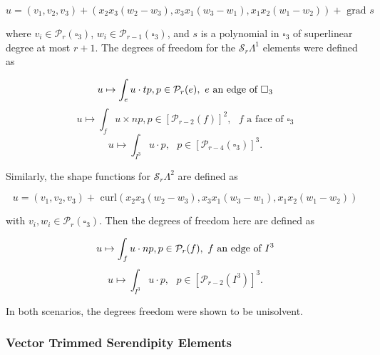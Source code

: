 \documentclass[manuscript,screen]{acmart}
\newcommand{\calP}{\mathcal{P}}
\newcommand{\calS}{\mathcal{S}}
\begin{document}
  \begin{equation}
      u = (v_1, v_2, v_3) +(x_2x_3(w_2 - w_3), x_3x_1(w_3 - w_1), x_1x_2(w_1 - w_2)) + \text{ grad } s
  \end{equation}
  
  \noindent where $v_i \in \calP_r(\square_3)$, $w_i \in \calP_{r-1}(\square_3)$, and $s$ is a polynomial in $\square_3$ of superlinear degree at most $r+1$. The degrees of freedom for the $\calS_r \Lambda^1$ elements were defined as 
  
  \begin{equation*}
      u \mapsto \int_e u \cdot tp, p \in \calP_r(e), \text{ } e \text{ an edge of } \square_3 \\
  \end{equation*}
  \begin{equation*}
      u \mapsto \int_f u \times np, p \in [\calP_{r-2}(f)]^2, \text{ } f \text{ a face of } \square_3
  \end{equation*}
  \begin{equation*}
      u \mapsto \int_{I^3} u \cdot p, \text{ } p \in [\calP_{r-4}(\square_3)]^3.
  \end{equation*}
  
  Similarly, the shape functions for $\calS_r \Lambda^2$ are defined as
  
  \begin{equation}
      u = (v_1, v_2, v_3) + \text{ curl}(x_2x_3(w_2 - w_3), x_3x_1(w_3 - w_1), x_1x_2(w_1-w_2))
  \end{equation}
  
  \noindent with $v_i, w_i \in \calP_r (\square_3)$.  Then the degrees of freedom here are defined as
  
  \begin{equation*}
      u \mapsto \int_f u \cdot np, p \in \calP_r(f), \text{ } f \text{ an edge of } I^3 \\
  \end{equation*}
  \begin{equation*}
      u \mapsto \int_{I^3} u \cdot p, \text{ } p \in [\calP_{r-2}(I^3)]^3.
  \end{equation*}
  
  In both scenarios, the degrees freedom were shown to be unisolvent. 
  
  \subsubsection{Vector Trimmed Serendipity Elements}
  
\end{document}
